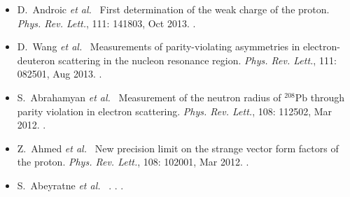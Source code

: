 \documentclass[11pt,letterpaper]{article}
\newcommand{\etal}{\textit{et al.}}
\begin{document}
\begin{itemize}
 \setlength{\itemsep}{0pt}
 \setlength{\parskip}{0pt}
 \setlength{\parsep}{0pt}
 \item D.~Androic \etal~
  \newblock First determination of the weak charge of the proton.
  \newblock \emph{Phys. Rev. Lett.}, 111: 141803, Oct 2013.
  \cite{PhysRevLett.111.141803}.
 \item D.~Wang \etal~
  \newblock Measurements of parity-violating asymmetries in electron-deuteron scattering in the nucleon resonance region.
  \newblock \emph{Phys. Rev. Lett.}, 111: 082501, Aug 2013.
  \cite{Wang:2013kkc}.
 \item S.~Abrahamyan \etal~
  \newblock Measurement of the neutron radius of $^{208}\mathrm{Pb}$ through parity violation in electron scattering.
  \newblock \emph{Phys. Rev. Lett.}, 108: 112502, Mar 2012{}.
  \cite{PhysRevLett.108.112502}.
 \item Z.~Ahmed \etal~
  \newblock New precision limit on the strange vector form factors of the proton.
  \newblock \emph{Phys. Rev. Lett.}, 108: 102001, Mar 2012.
  \cite{PhysRevLett.108.102001}.
 \item S.~{Abeyratne} \etal~
  .
  .
  \cite{Abeyratne:2012ah}. \label{eic}
\end{itemize}

\end{document}
